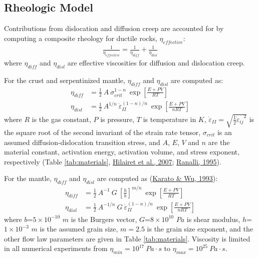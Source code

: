 \hypertarget{rheologicModel}{%
\subsection{Rheologic Model}\label{rheologicModel}}

Contributions from dislocation and diffusion creep are accounted for by computing a composite rheology for ductile rocks, \(\eta_{effective}\):
\begin{equation}
  \begin{aligned}
    \frac{1}{\eta_{effective}} = \frac{1}{\eta_{diff}} + \frac{1}{\eta_{disl}}
  \end{aligned} 
  \label{eq:ductile}
\end{equation}
where \(\eta_{diff}\) and \(\eta_{disl}\) are effective viscosities for diffusion and dislocation creep.

\noindent For the crust and serpentinized mantle, \(\eta_{diff}\) and \(\eta_{disl}\) are computed as:
\begin{equation}
  \begin{aligned}
    \eta_{diff} &= \frac{1}{2} \ A \ \sigma_{crit}^{1-n} \ \exp\left[\frac{E+PV}{RT}\right] \\
    \eta_{disl} &= \frac{1}{2} \ A^{1/n} \ \dot{\varepsilon}_{II}^{(1-n)/n} \ \exp\left[\frac{E+PV}{nRT}\right]
  \label{eq:crust}
  \end{aligned}
\end{equation}
where \(R\) is the gas constant, \(P\) is pressure, \(T\) is temperature in \(K\), \({\dot{\varepsilon}}_{II} = \sqrt{\frac{1}{2}{{\dot{\varepsilon}}_{ij}}^{2}}\) is the square root of the second invariant of the strain rate tensor, \(\sigma_{crit}\) is an assumed diffusion-dislocation transition stress, and \(A\), \(E\), \(V\) and \(n\) are the material constant, activation energy, activation volume, and stress exponent, respectively (Table \ref{tab:materials}, \protect\hyperlink{ref-hilairet2007}{Hilairet et al., 2007}; \protect\hyperlink{ref-ranalli1995}{Ranalli, 1995}).

\noindent For the mantle, \(\eta_{diff}\) and \(\eta_{disl}\) are computed as (\protect\hyperlink{ref-karato1993}{Karato \& Wu, 1993}):
\begin{equation}
  \begin{aligned}
    \eta_{diff} &= \frac{1}{2} \ A^{-1} \ G \ \left[\frac{h}{b}\right]^{m/n} \ \exp\left[\frac{E+PV}{RT}\right] \\
    \eta_{disl} &= \frac{1}{2} \ A^{-1/n} \ G \ \dot{\varepsilon}_{II}^{(1-n)/n} \ \exp\left[\frac{E+PV}{nRT}\right]
  \end{aligned}
  \label{eq:mantle}
\end{equation}
where \(b\)=\(5\times10^{-10}\) \(m\) is the Burgers vector, \(G\)=\(8\times10^{10}\) \(Pa\) is shear modulus, \(h\)=\(1\times10^{-3}\) \(m\) is the assumed grain size, \(m=2.5\) is the grain size exponent, and the other flow law parameters are given in Table \ref{tab:materials}. Viscosity is limited in all numerical experiments from \(\eta_{min} = 10^{17}\ Pa \cdot s\) to \(\eta_{max} = 10^{25}\ Pa \cdot s\).

